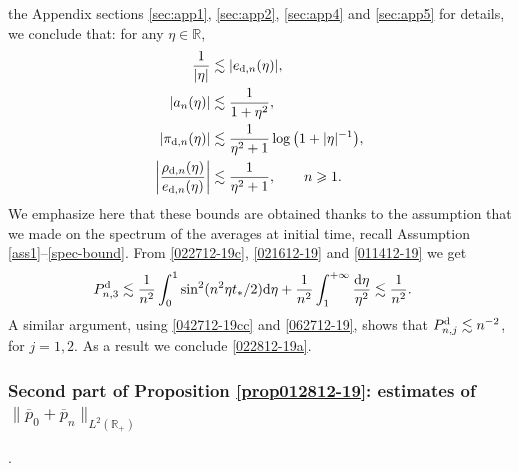 \documentclass[EJP]{ejpecp} %
\newcommand\R{{\mathbb R}}
\newcommand{\dd  }{\mathrm{d}}
\renewcommand{\bar}{\overline}
\numberwithin{equation}{section}
\begin{document}
the Appendix sections \ref{sec:app1}, \ref{sec:app2}, \ref{sec:app4} and \ref{sec:app5} for details, we conclude that: for any $\eta \in \R$,
\begin{align}
\label{021612-19}
\frac{1}{|\eta|}&\lesssim |e_{{\rm d},n}(\eta)|, \\
\label{011412-19}
  |a_{n}(\eta)|&\lesssim \frac{1}{1+\eta^2},\\
\label{042712-19cc}
 |\pi_{{\rm d},n}(\eta)|&\lesssim 
  \frac{1}{\eta^2+1} \log\big(1+|\eta|^{-1}\big) ,\\
\label{062712-19}
 \bigg|\frac{\rho_{{\rm d},n}(\eta)}{e_{{\rm d},n}(\eta)}\bigg|&\lesssim 
  \frac{1}{\eta^2+1}, \qquad n \geqslant 1.
\end{align}
{We} emphasize here that these bounds are obtained thanks to the assumption that we made on the spectrum of the averages at initial time, recall Assumption \ref{ass1}--\eqref{spec-bound}.  From \eqref{022712-19c},     \eqref{021612-19} and \eqref{011412-19} we get
\begin{align*}
&P^{\rm d}_{n,3}\lesssim \frac{1}{n^2}\int_{0}^1\sin^2(n^2\eta
  t_*/2)\dd\eta+\frac{1}{n^2}\int_{1}^{+\infty}\frac{\dd\eta}{\eta^2}\lesssim \frac{1}{n^2}.
\end{align*}
A similar argument, using \eqref{042712-19cc} and \eqref{062712-19}, shows that $P^{\rm d}_{n,j}\lesssim n^{-2}$, for $j=1,2.$ 
As a result we conclude \eqref{022812-19a}.











\subsubsection{Second part of Proposition \ref{prop012812-19}: estimates of $\|\bar p_0+\bar p_n\|_{L^2(\R_+)}$}. 
\end{document}
